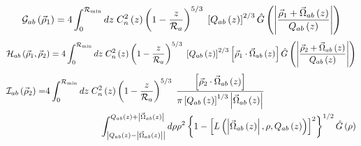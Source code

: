 \begin{equation}\label{caliph_G}
\mathcal{G}_{ab}\left(\vec{\rho}_{1}\right) = 
4 \int_{0}^{\mathcal{R}_{\rm min}} dz \; C_{n}^{2}\left(z\right) \left( 1 - \frac{z}{\mathcal{R}_{a}}\right)^{5/3}\; 
\left[Q_{ab}\left(z\right)\right]^{2/3} 
\hat{G}\left(\left\vert \frac{\vec{\rho}_{1} + \vec{\Omega}_{ab}\left(z\right)}{Q_{ab}\left(z\right)}\right\vert\right)
\end{equation}
\begin{equation}\label{caliph_H}
\mathcal{H}_{ab}\left(\vec{\rho}_{1}, \vec{\rho}_{2}\right) = 
4 \int_{0}^{\mathcal{R}_{\rm min}} dz \; C_{n}^{2}\left(z\right) \left( 1 - \frac{z}{\mathcal{R}_{a}}\right)^{5/3}\; 
\left[Q_{ab}\left(z\right)\right]^{2/3} \left[\vec{\rho}_{1}\cdot\vec{\Omega}_{ab}\left(z\right)\right]
\hat{G}\left(\left\vert \frac{\vec{\rho}_{2} + \vec{\Omega}_{ab}\left(z\right)}{Q_{ab}\left(z\right)}\right\vert\right)
\end{equation}
\begin{equation}\label{caliph_I}
\begin{split}
\mathcal{I}_{ab}\left(\vec{\rho}_{2}\right) = & 
4 \int_{0}^{\mathcal{R}_{\rm min}} dz \; C_{n}^{2}\left(z\right) \left( 1 - \frac{z}{\mathcal{R}_{a}}\right)^{5/3}\; 
\frac{\left[\vec{\rho}_{2}\cdot\vec{\Omega}_{ab}\left(z\right)\right] }{\pi \left[Q_{ab}\left(z\right)\right]^{1/3} 
\left\vert\vec{\Omega}_{ab}\left(z\right)\right\vert} \\
& 
\quad\quad\quad\quad\quad\quad
\int^{Q_{ab}\left(z\right) +\left\vert \vec{\Omega}_{ab}\left(z\right)\right\vert}_{\left\vert Q_{ab}\left(z\right) - \left\vert\vec{\Omega}_{ab}\left(z\right)\right\vert\right\vert}
d\rho \rho^{2} \left\{1 - \left[L\left(\left\vert\vec{\Omega}_{ab}\left(z\right)\right\vert, \rho, Q_{ab}\left(z\right)\right)\right]^{2}\right\}^{1/2} 
\hat{G}\left(\rho\right)
\end{split}
\end{equation}

